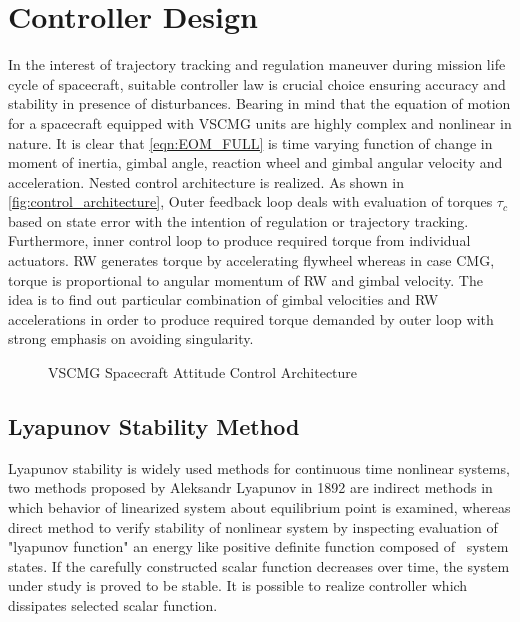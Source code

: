 \chapter{Controller Design}
\label{chap:4}
In the interest of trajectory tracking and regulation maneuver during mission life cycle of spacecraft, suitable controller law is crucial choice ensuring accuracy and stability in presence of disturbances. Bearing in mind that the equation of motion for a spacecraft equipped with VSCMG units are highly complex and nonlinear in nature. It is clear that \autoref{eqn:EOM_FULL} is time varying function of change in moment of inertia, gimbal angle, reaction wheel and gimbal angular velocity and acceleration. Nested control architecture is realized. As shown in \autoref{fig:control_architecture}, Outer feedback loop deals with evaluation of torques $\tau_{c}$ based on state error with the intention of regulation or trajectory tracking. Furthermore, inner control loop to produce required torque from individual actuators. RW generates torque by accelerating flywheel whereas in case CMG, torque is proportional to angular momentum of RW and gimbal velocity. The idea is to find out particular combination of gimbal velocities and RW accelerations in order to produce required torque demanded by outer loop with strong emphasis on avoiding singularity.
\begin{figure}[!h]
    \centering
    
    \caption{VSCMG Spacecraft Attitude Control Architecture}
    \label{fig:control_architecture}
\end{figure}

\section{Lyapunov Stability Method}
Lyapunov stability is widely used methods for continuous time nonlinear systems, two methods proposed by Aleksandr Lyapunov in 1892 are indirect methods \cite{Liapunov1968} in which behavior of linearized system about equilibrium point is examined, whereas direct method to verify stability of nonlinear system by inspecting evaluation of "lyapunov function" an energy like positive definite function composed of \ system states. If the carefully constructed scalar function decreases over time, the system under study is proved to be stable. It is possible to realize controller which dissipates selected scalar function.

